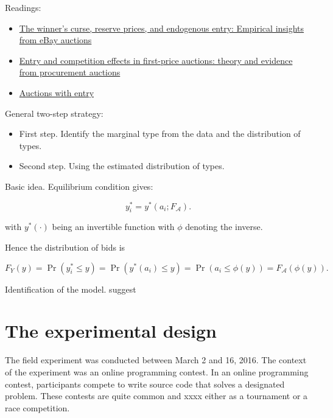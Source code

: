 \documentclass[12pt,]{article}
\theoremstyle{plain} %
\begin{document}
Readings:

\begin{itemize}
\item
  \href{http://citeseerx.ist.psu.edu/viewdoc/download?doi=10.1.1.199.680\&rep=rep1\&type=pdf}{The
  winner's curse, reserve prices, and endogenous entry: Empirical
  insights from eBay auctions}
\item
  \href{https://www.econstor.eu/bitstream/10419/79263/1/516364804.pdf}{Entry
  and competition effects in first-price auctions: theory and evidence
  from procurement auctions}
\item
  \href{http://www.vita.mcafee.cc/PDF/AuctionswithEntry.pdf}{Auctions
  with entry}
\end{itemize}

General two-step strategy:

\begin{itemize}
\item
  First step. Identify the marginal type from the data and the
  distribution of types.
\item
  Second step. Using the estimated distribution of types.
\end{itemize}

Basic idea. Equilibrium condition gives:

\begin{equation}
  y_i^* = y^*(a_i; F_{\mathcal{A}}). 
\end{equation}

with \(y^*(\cdot)\) being an invertible function with \(\phi\) denoting
the inverse.

Hence the distribution of bids is

\begin{equation}
F_{Y}(y) = \Pr(y_i^* \leq y) 
        = \Pr(y^*(a_i) \leq y) 
        = \Pr(a_i \leq \phi(y)) 
        = F_\mathcal{A}( \phi(y)).
\end{equation}

Identification of the model. suggest

\section{The experimental design}\label{the-experimental-design}

The field experiment was conducted between March 2 and 16, 2016. The
context of the experiment was an online programming contest. In an
online programming contest, participants compete to write source code
that solves a designated problem. These contests are quite common and
xxxx either as a tournament or a race competition.
\end{document}
